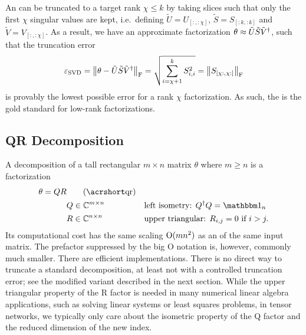 An  can be truncated to a target rank $\chi \leq k$ by taking slices such that only the first $\chi$ singular values are kept, i.e.~defining $\tilde{U} = U_{[:, :\chi]}$, $\tilde{S} = S_{[:k, :k]}$ and $\tilde{V} = V_{[:, :\chi]}$.
%
As a result, we have an approximate factorization $\theta \approx \tilde{U} \tilde{S} \tilde{V}^\dagger$, such that the truncation error
\begin{equation}
    \varepsilon_\text{SVD}
    = \Fnorm{\theta - \tilde{U} \tilde{S} \hconj{\tilde{V}}}
    = \sqrt{\sum_{i=\chi + 1}^{k} S_{i,i}^2}
    = \Fnorm{S_{[\chi:, \chi:]}}
\end{equation}
is provably the lowest possible error for a rank $\chi$ factorization.
%
As such, the  is the gold standard for low-rank factorizations.


\subsection{QR Decomposition}
\label{subsec:truncation:factorizations:qr}
%
A  decomposition of a tall rectangular $m \times n$ matrix $\theta$ where $m \geq n$ is a factorization
%
\begin{equation}
\begin{aligned}
    \theta = Q R &\qquad \text{(\acroshort{qr})} &&
    \\
    &Q \in \Cbb^{m \times n}  &&\text{left isometry: } \hconj{Q} Q = \eye_n
    \\
    &R \in \Cbb^{n \times n}  &&\text{upper triangular: } R_{i, j} = 0 \text{ if } i > j.
\end{aligned}
\end{equation}
Its computational cost has the same scaling $\mathrm{O}(mn^2)$ as an  of the same input matrix. The prefactor suppressed by the big O notation is, however, commonly much smaller.
%
There are efficient  implementations.
%
There is no direct way to truncate a standard  decomposition, at least not with a controlled truncation error; see the modified variant described in the next section.
%
While the upper triangular property of the R factor is needed in many numerical linear algebra applications, such as solving linear systems or least squares problems, in tensor networks, we typically only care about the isometric property of the Q factor and the reduced dimension of the new index.

